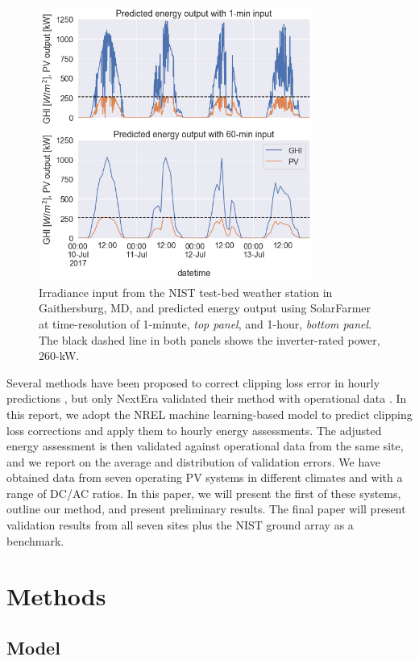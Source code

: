 \documentclass[conference]{IEEEtran}
\begin{document}
\begin{figure}[htbp]
\centerline{\includegraphics[width=9cm]{hourly_v_1-min_clipping.png}}
\caption{Irradiance input from the NIST test-bed weather station in Gaithersburg, MD, and predicted energy output using SolarFarmer at time-resolution of 1-minute, \textit{top panel}, and 1-hour, \textit{bottom panel}. The black dashed line in both panels shows the inverter-rated power, 260-kW.}
\label{fig:irradiance-and-power}
\end{figure}

Several methods have been proposed to correct clipping loss error in hourly predictions \cite{Cormode2019,Kharait,Anderson2020,Bradford}, but only NextEra validated their method with operational data \cite{Bradford}. In this report, we adopt the NREL machine learning-based model \cite{Anderson2020} to predict clipping loss corrections and apply them to hourly energy assessments. The adjusted energy assessment is then validated against operational data from the same site, and we report on the average and distribution of validation errors.  We have obtained data from seven operating PV systems in different climates and with a range of DC/AC ratios. In this paper, we will present the first of these systems, outline our method, and present preliminary results. The final paper will present validation results from all seven sites plus the NIST ground array \cite{Boyd2017b} as a benchmark.

\section{Methods}

\subsection{Model}
\end{document}
